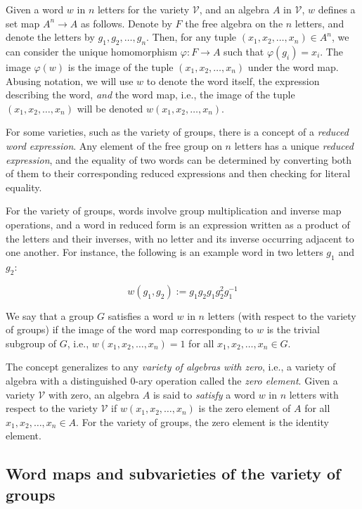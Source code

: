 Given a word $w$ in $n$ letters for the variety $\mathcal{V}$, and an
algebra $A$ in $\mathcal{V}$, $w$ defines a set map $A^n \to A$ as
follows. Denote by $F$ the free algebra on the $n$ letters, and denote
the letters by $g_1,g_2,\dots,g_n$. Then, for any tuple
$(x_1,x_2,\dots,x_n) \in A^n$, we can consider the unique homomorphism
$\varphi:F \to A$ such that $\varphi(g_i) = x_i$. The image
$\varphi(w)$ is the image of the tuple $(x_1,x_2,\dots,x_n)$ under the
word map. Abusing notation, we will use $w$ to denote the word itself,
the expression describing the word, {\em and} the word map, i.e., the
image of the tuple $(x_1,x_2,\dots,x_n)$ will be denoted
$w(x_1,x_2,\dots,x_n)$.

For some varieties, such as the variety of groups, there is a concept
of a {\em reduced word expression}. Any element of the free group on
$n$ letters has a unique {\em reduced expression}, and the equality of
two words can be determined by converting both of them to their
corresponding reduced expressions and then checking for literal
equality.

For the variety of groups, words involve group multiplication and
inverse map operations, and a word in reduced form is an expression
written as a product of the letters and their inverses, with no letter
and its inverse occurring adjacent to one another. For instance, the
following is an example word in two letters $g_1$ and $g_2$:

$$w(g_1,g_2) := g_1g_2g_1g_2^2g_1^{-1}$$

We say that a group $G$ satisfies a word $w$ in $n$ letters (with
respect to the variety of groups) if the image of the word map
corresponding to $w$ is the trivial subgroup of $G$, i.e.,
$w(x_1,x_2,\dots,x_n) = 1$ for all $x_1,x_2,\dots,x_n \in G$. 

The concept generalizes to any {\em variety of algebras with zero},
i.e., a variety of algebra with a distinguished 0-ary operation called
the {\em zero element}. Given a variety $\mathcal{V}$ with zero, an
algebra $A$ is said to {\em satisfy} a word $w$ in $n$ letters with
respect to the variety $\mathcal{V}$ if $w(x_1,x_2,\dots,x_n)$ is the
zero element of $A$ for all $x_1,x_2,\dots,x_n \in A$. For the variety
of groups, the zero element is the identity element.
\subsection{Word maps and subvarieties of the variety of groups}

